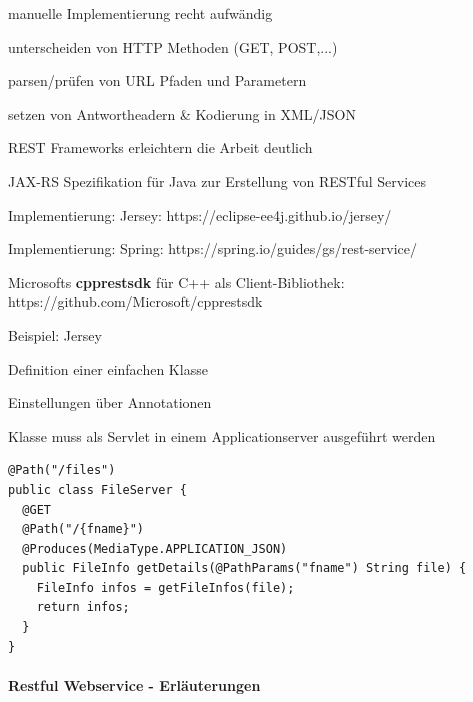 \documentclass[10pt]{article}
\begin{document}
  \begin{itemize*}
    \item manuelle Implementierung recht aufwändig
    \begin{itemize*}
      \item unterscheiden von HTTP Methoden (GET, POST,...)
      \item parsen/prüfen von URL Pfaden und Parametern
      \item setzen von Antwortheadern \& Kodierung in XML/JSON
    \end{itemize*}
    \item REST Frameworks erleichtern die Arbeit deutlich
    \begin{itemize*}
      \item JAX-RS Spezifikation für Java zur Erstellung von RESTful Services
      \begin{itemize*}
        \item Implementierung: Jersey: https://eclipse-ee4j.github.io/jersey/
        \item Implementierung: Spring:
        https://spring.io/guides/gs/rest-service/
      \end{itemize*}
      \item Microsofts \textbf{cpprestsdk} für C++ als Client-Bibliothek:
      https://github.com/Microsoft/cpprestsdk
    \end{itemize*}
  \end{itemize*}
  \begin{itemize*}
    \item Beispiel: Jersey
    \item Definition einer einfachen Klasse
    \begin{itemize*}
      \item Einstellungen über Annotationen
      \item Klasse muss als Servlet in einem Applicationserver ausgeführt werden
    \end{itemize*}
  \end{itemize*}
  \begin{lstlisting}
@Path("/files")
public class FileServer {
  @GET
  @Path("/{fname}")
  @Produces(MediaType.APPLICATION_JSON)
  public FileInfo getDetails(@PathParams("fname") String file) {
    FileInfo infos = getFileInfos(file);
    return infos;
  }
}
\end{lstlisting}
  
  \paragraph{Restful Webservice - Erläuterungen}
  
\end{document}
